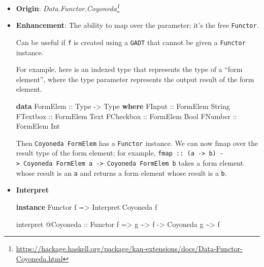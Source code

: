 \documentclass[]{article}
\newenvironment{Shaded}{}{}
\newcommand{\DataTypeTok}[1]{\textcolor[rgb]{0.56,0.13,0.00}{#1}}
\newcommand{\KeywordTok}[1]{\textcolor[rgb]{0.00,0.44,0.13}{\textbf{#1}}}
\newcommand{\NormalTok}[1]{#1}
\newcommand{\OperatorTok}[1]{\textcolor[rgb]{0.40,0.40,0.40}{#1}}
\newcommand{\OtherTok}[1]{\textcolor[rgb]{0.00,0.44,0.13}{#1}}
\renewcommand{\href}[2]{#2\footnote{\url{#1}}}
\begin{document}
\begin{itemize}
\item
  \textbf{Origin}:
  \emph{\href{https://hackage.haskell.org/package/kan-extensions/docs/Data-Functor-Coyoneda.html}{Data.Functor.Coyoneda}}
\item
  \textbf{Enhancement}: The ability to map over the parameter; it's the free
  \texttt{Functor}.

  Can be useful if \texttt{f} is created using a \texttt{GADT} that cannot be
  given a \texttt{Functor} instance.

  For example, here is an indexed type that represents the type of a ``form
  element'', where the type parameter represents the output result of the form
  element.

\begin{Shaded}
\begin{Highlighting}[]
\KeywordTok{data} \DataTypeTok{FormElem}\OtherTok{ ::} \DataTypeTok{Type} \OtherTok{{-}\textgreater{}} \DataTypeTok{Type} \KeywordTok{where}
    \DataTypeTok{FInput}\OtherTok{    ::} \DataTypeTok{FormElem} \DataTypeTok{String}
    \DataTypeTok{FTextbox}\OtherTok{  ::} \DataTypeTok{FormElem} \DataTypeTok{Text}
    \DataTypeTok{FCheckbox}\OtherTok{ ::} \DataTypeTok{FormElem} \DataTypeTok{Bool}
    \DataTypeTok{FNumber}\OtherTok{   ::} \DataTypeTok{FormElem} \DataTypeTok{Int}
\end{Highlighting}
\end{Shaded}

  Then \texttt{Coyoneda\ FormElem} has a \texttt{Functor} instance. We can now
  fmap over the result type of the form element; for example,
  \texttt{fmap\ ::\ (a\ -\textgreater{}\ b)\ -\textgreater{}\ Coyoneda\ FormElem\ a\ -\textgreater{}\ Coyoneda\ FormElem\ b}
  takes a form element whose result is an \texttt{a} and returns a form element
  whose result is a \texttt{b}.
\item
  \textbf{Interpret}

\begin{Shaded}
\begin{Highlighting}[]
\KeywordTok{instance} \DataTypeTok{Functor}\NormalTok{ f }\OtherTok{=\textgreater{}} \DataTypeTok{Interpret} \DataTypeTok{Coyoneda}\NormalTok{ f}

\NormalTok{interpret }\OperatorTok{@}\DataTypeTok{Coyoneda}
\OtherTok{    ::} \DataTypeTok{Functor}\NormalTok{ f}
    \OtherTok{=\textgreater{}}\NormalTok{ g }\OperatorTok{\textasciitilde{}\textgreater{}}\NormalTok{ f}
    \OtherTok{{-}\textgreater{}} \DataTypeTok{Coyoneda}\NormalTok{ g }\OperatorTok{\textasciitilde{}\textgreater{}}\NormalTok{ f}
\end{Highlighting}
\end{Shaded}


\end{itemize}
\end{document}

